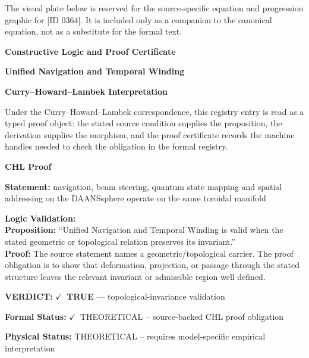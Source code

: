 \begingroup\footnotesize\sloppy
The visual plate below is reserved for the source-specific equation and progression graphic for [ID 0364]. It is included only as a companion to the canonical equation, not as a substitute for the formal text.
\par\endgroup
\ifTZPDarkEdition
{}
\fi

\clearpage
\begingroup\tzpsupportsetup
\noindent\textbf{\fontsize{10.8pt}{12.8pt}\selectfont [ID 0364] Constructive Logic and Proof Certificate}\par
\noindent\textbf{\fontsize{10pt}{12pt}\selectfont Unified Navigation and Temporal Winding}\par
\vspace{0.45em}
\begingroup
\footnotesize
\setlength{\parskip}{0.22em}
\setlength{\parindent}{0pt}
\noindent\textbf{Curry--Howard--Lambek Interpretation}\par
Under the Curry--Howard--Lambek correspondence, this registry entry is read as a typed proof
object: the stated source condition supplies the proposition, the derivation supplies the
morphism, and the proof certificate records the machine handles needed to check the obligation
in the formal registry.

\vspace{0.45em}
\noindent\textbf{CHL Proof}\par
\textbf{Statement:} navigation, beam steering, quantum state mapping and spatial addressing on the
DAANSsphere operate on the same toroidal manifold

\textbf{Logic Validation:}\\
\textbf{Proposition:} ``Unified Navigation and Temporal Winding is valid when the stated geometric or
topological relation preserves its invariant.''\\
\textbf{Proof:} The source statement names a geometric/topological carrier. The proof obligation is to
show that deformation, projection, or passage through the stated structure leaves the
relevant invariant or admissible region well defined.

\textbf{VERDICT:} \ensuremath{\checkmark}\ \textbf{TRUE} --- topological-invariance validation

\textbf{Formal Status:} \ensuremath{\checkmark}\ THEORETICAL -- source-backed CHL proof obligation

\textbf{Physical Status:} THEORETICAL -- requires model-specific empirical interpretation
\par\vspace{0.45em}
\par
\ifTZPDarkEdition
{}
\fi
\endgroup
\endgroup
